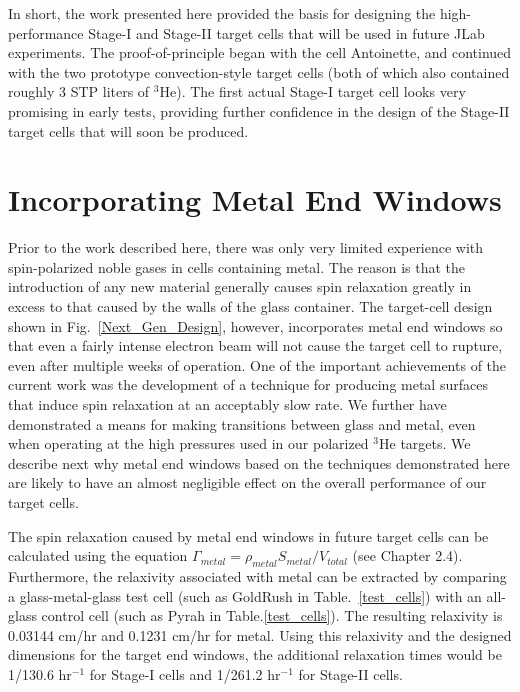 In short, the work presented here provided the basis for designing the high-performance Stage-I and Stage-II target cells that will be used in future JLab experiments. The proof-of-principle began with the cell Antoinette, and continued with the two prototype convection-style target cells (both of which
also contained roughly 3 STP liters of $^3$He). The first actual Stage-I target cell looks very promising in early tests, providing further confidence in the design of the Stage-II target cells that will soon be produced.

\section{Incorporating Metal End Windows}

Prior to the work described here, there was only very limited experience with spin-polarized noble gases in cells containing metal. The reason is that the introduction of any new material  generally causes spin relaxation greatly in excess to that caused by the walls of the glass container. The target-cell design shown in Fig.~\ref{Next_Gen_Design}, however, incorporates metal end windows so that even a fairly intense electron beam will not cause the target cell to rupture, even after multiple weeks of operation. One of the important achievements
of the current work was the development of a technique for producing metal surfaces that induce spin relaxation at an acceptably slow rate. We further have demonstrated a means for making transitions between glass and metal, even when operating at the high pressures used in our polarized $^3$He targets. We describe
next why metal end windows based on the techniques demonstrated here are likely to have an almost negligible effect on the overall performance of our target cells.

The spin relaxation caused by metal end windows in future target cells can be calculated using the equation $\Gamma_{metal} = \rho_{metal} S_{metal}/V_{total}$ (see Chapter 2.4). Furthermore, the relaxivity associated with metal can be extracted by comparing a glass-metal-glass test cell (such as GoldRush in Table.~\ref{test_cells}) with an all-glass control cell (such as Pyrah in Table.\ref{test_cells}). The resulting relaxivity is 0.03144 cm/hr and 0.1231 cm/hr for metal. Using this relaxivity and the designed dimensions for the target end windows, the additional relaxation times would be 1/130.6 hr$^{-1}$ for Stage-I cells and 1/261.2 hr$^{-1}$ for Stage-II cells.

